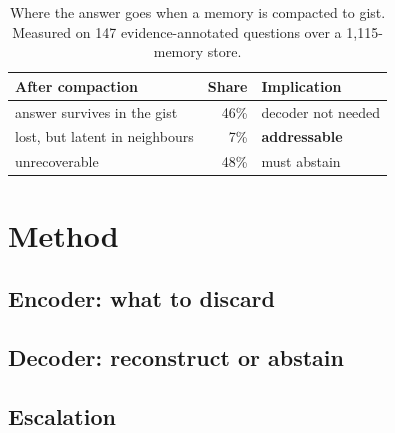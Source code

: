 \documentclass{article}
\begin{document}
\begin{table}[t]
\caption{Where the answer goes when a memory is compacted to gist. Measured on
147 evidence-annotated questions over a 1{,}115-memory store.}
\label{tab:ceiling}
\centering\small
\begin{tabular}{@{}lrl@{}}
\toprule
\textbf{After compaction} & \textbf{Share} & \textbf{Implication} \\
\midrule
answer survives in the gist        & 46\% & decoder not needed \\
\rowcolor{hl}
lost, but latent in neighbours     & \phantom{0}7\% & \textbf{addressable} \\
unrecoverable                      & 48\% & \textcolor{bad}{must abstain} \\
\bottomrule
\end{tabular}
\end{table}

%

\section{Method}
\label{sec:method}

\subsection{Encoder: what to discard}

\subsection{Decoder: reconstruct or abstain}

\subsection{Escalation}
\end{document}

